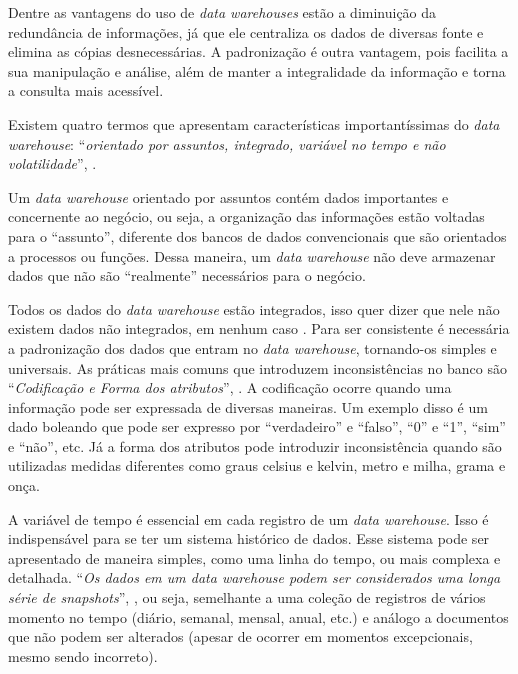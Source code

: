 Dentre as vantagens do uso de \textit{data warehouses} estão a diminuição da redundância de informações, já que ele centraliza os dados de diversas fonte e elimina as cópias desnecessárias. A padronização é outra vantagem, pois facilita a sua manipulação e análise, além de manter a integralidade da informação e torna a consulta mais acessível.

Existem quatro termos que apresentam características importantíssimas do \textit{data warehouse}: \enquote{\textit{orientado por assuntos, integrado, variável no tempo e não volatilidade}}, \cite{vida2021datawarehouse}.

Um \textit{data warehouse} orientado por assuntos contém dados importantes e concernente ao negócio, ou seja, a organização das informações estão voltadas para o \enquote{assunto}, diferente dos bancos de dados convencionais que são orientados a processos ou funções. Dessa maneira, um \textit{data warehouse} não deve armazenar dados que não são \enquote{realmente} necessários para o negócio.

Todos os dados do \textit{data warehouse} estão integrados, isso quer dizer que nele não existem dados não integrados, em nenhum caso \cite{turban2009business}. Para ser consistente é necessária a padronização dos dados que entram no \textit{data warehouse}, tornando-os simples e universais. As práticas mais comuns que introduzem inconsistências no banco são \enquote{\textit{Codificação e Forma dos atributos}}, \cite{vida2021datawarehouse}. A codificação ocorre quando uma informação pode ser expressada de diversas maneiras. Um exemplo disso é um dado boleando que pode ser expresso por \enquote{verdadeiro} e \enquote{falso}, \enquote{0} e \enquote{1}, \enquote{sim} e \enquote{não}, etc. Já a forma dos atributos pode introduzir inconsistência quando são utilizadas medidas diferentes como graus celsius e kelvin, metro e milha, grama e onça.

A variável de tempo é essencial em cada registro de um \textit{data warehouse}. Isso é indispensável para se ter um sistema histórico de dados. Esse sistema pode ser apresentado de maneira simples, como uma linha do tempo, ou mais complexa e detalhada. \enquote{\textit{Os dados em um data warehouse podem ser considerados uma longa série de snapshots}}, \cite{boscarioli2016mineracao}, ou seja, semelhante a uma coleção de registros de vários momento no tempo (diário, semanal, mensal, anual, etc.) e análogo a documentos que não podem ser alterados (apesar de ocorrer em momentos excepcionais, mesmo sendo incorreto).

